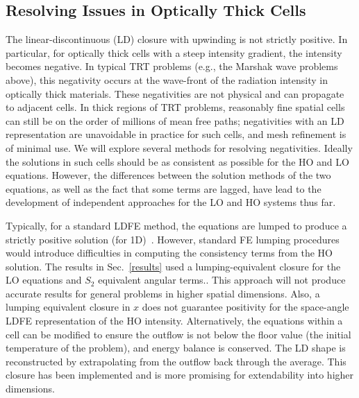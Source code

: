 
\subsection{Resolving Issues in Optically Thick Cells}
\label{sec:negs}

The linear-discontinuous (LD) closure with upwinding is not strictly positive.  In particular, for
optically thick cells with a steep intensity gradient, the intensity becomes
negative. In typical TRT problems (e.g., the Marshak wave problems above), this negativity occurs at the wave-front of the
radiation intensity in optically thick materials.
These negativities are not physical and can propagate to adjacent cells. In thick regions of
TRT problems, reasonably fine spatial cells can still be on the order of millions of mean
free paths; negativities with an LD representation are unavoidable in practice for
such cells, and mesh refinement is of minimal use.  We will explore several methods
for resolving negativities.  Ideally the solutions in
such cells should be as consistent as possible for the HO and LO equations.  However,
the differences between the solution methods of the two equations, as well as the
fact that some terms are lagged, have lead to the development of independent
approaches for the LO and HO systems thus far.

Typically, for a standard LDFE method,
the equations are lumped to produce a strictly positive solution (for 1D)~\cite{morel_newton}. However, standard FE lumping
procedures would introduce difficulties in computing the consistency terms from the
HO solution.    The results in Sec.~\ref{results} used a lumping-equivalent closure for the LO equations and $S_2$ equivalent angular terms..
This approach will not produce
accurate results for general problems in higher spatial dimensions. Also, a lumping equivalent closure in $x$ does not guarantee positivity for the space-angle LDFE
representation of the HO intensity.
Alternatively, the equations within a cell can be modified to ensure the outflow is not
below the floor value (the initial temperature of the problem), and energy balance is
conserved.  The LD shape is reconstructed by extrapolating from the outflow back
through the average.  This closure has been implemented and is more promising for extendability into higher
dimensions.

